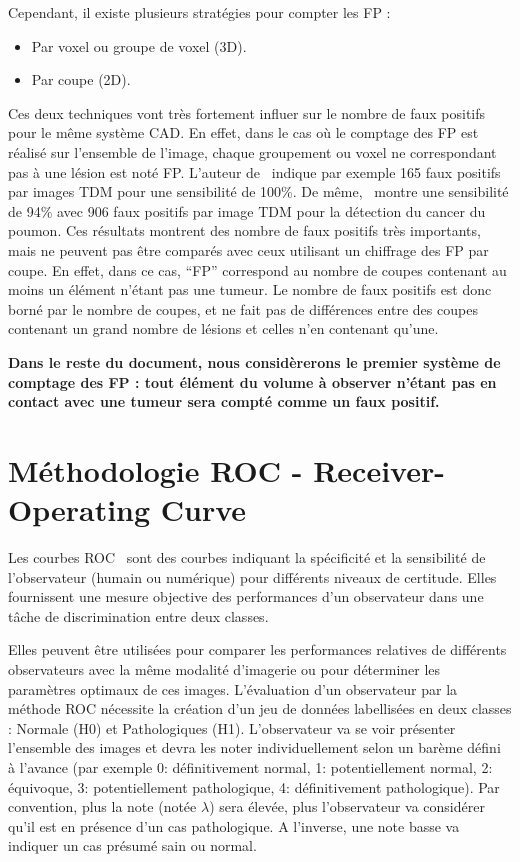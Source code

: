 Cependant, il existe plusieurs stratégies pour compter les FP :
\begin{itemize}
 \item Par voxel ou groupe de voxel (3D).
 \item Par coupe (2D).
\end{itemize}

Ces deux techniques vont très fortement influer sur le nombre de faux positifs pour le même système CAD. En effet, dans le cas où le comptage des FP est réalisé sur l'ensemble de l'image, chaque groupement ou voxel ne correspondant pas à une lésion est noté FP. L'auteur de~\cite{paik2004surface} indique par exemple 165 faux positifs par images TDM pour une sensibilité de 100\%. De même,~\cite{zhao2003automatic} montre une sensibilité de 94\% avec 906 faux positifs par image TDM pour la détection du cancer du poumon. Ces résultats montrent des nombre de faux positifs très importants, mais ne peuvent pas être comparés avec ceux utilisant un chiffrage des FP par coupe. En effet, dans ce cas, ``FP'' correspond au nombre de coupes contenant au moins un élément n'étant pas une tumeur. Le nombre de faux positifs est donc borné par le nombre de coupes, et ne fait pas de différences entre des coupes contenant un grand nombre de lésions et celles n'en contenant qu'une. 

\textbf{Dans le reste du document, nous considèrerons le premier système de comptage des FP : tout élément du volume à observer n'étant pas en contact avec une tumeur sera compté comme un faux positif.}


	\section{Méthodologie ROC - Receiver-Operating Curve}

Les courbes ROC~\cite{swets1982evaluation,metz1986roc} sont des courbes indiquant la spécificité et la sensibilité de l'observateur (humain ou numérique) pour différents niveaux de certitude. Elles fournissent une mesure objective des performances d'un observateur dans une tâche de discrimination entre deux classes. 

Elles peuvent être utilisées pour comparer les performances relatives de différents observateurs avec la même modalité d'imagerie ou pour déterminer les paramètres optimaux de ces images. L’évaluation d'un observateur par la méthode ROC nécessite la création d'un jeu de données labellisées en deux classes : Normale (H0) et Pathologiques (H1). L'observateur va se voir présenter l'ensemble des images et devra les noter individuellement selon un barème défini à l'avance (par exemple 0: définitivement normal, 1: potentiellement normal, 2: équivoque, 3: potentiellement pathologique, 4: définitivement pathologique). Par convention, plus la note (notée $\lambda$) sera élevée, plus l'observateur va considérer qu'il est en présence d'un cas pathologique. A l'inverse, une note basse va indiquer un cas présumé sain ou normal. 



